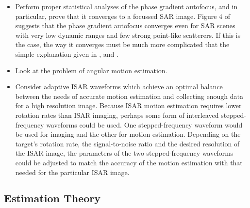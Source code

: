 \begin{itemize}
\item Perform proper statistical analyses of the phase gradient autofocus,
and in particular, prove that it converges to a focussed SAR image.  Figure
4 of \cite{Wah94} suggests that the phase gradient autofocus converges even
for SAR scenes with very low dynamic ranges and few strong point-like
scatterers.  If this is the case, the way it converges must be much more
complicated that the simple explanation given in \cite{Eic89},
\cite{Eic89b} and \cite{Jak89}.

\item Look at the problem of angular motion estimation.

\item Consider adaptive ISAR waveforms which achieve an optimal balance
between the needs of accurate motion estimation and collecting enough data
for a high resolution image.  Because ISAR motion estimation requires lower
rotation rates than ISAR imaging, perhaps some form of interleaved 
stepped-frequency waveforms could be used.  One stepped-frequency waveform
would be used for imaging and the other for motion estimation.  Depending on
the target's rotation rate, the signal-to-noise ratio and the desired resolution of
the ISAR image, the parameters of the two stepped-frequency waveforms could
be adjusted to match the accuracy of the motion estimation with that needed
for the particular ISAR image.
\end{itemize}

\subsection{Estimation Theory}
\label{co sec:et}

